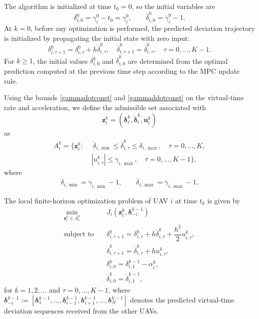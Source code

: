 \documentclass[letterpaper,journal]{IEEEtran}
\begin{document}
The algorithm is initialized at time \(t_0=0\), so the initial variables are
\[
\delta^0_{i,0}=\gamma_i^0-t_{0}=\gamma_i^0,
\qquad
\dot{\delta}^0_{i,0}=\dot{\gamma}_i^0-1.
\]
At $k=0$, before any optimization is performed, the predicted deviation trajectory is initialized by propagating the initial state with zero input:
\[
\delta^0_{i,\tau+1}=\delta^0_{i,\tau}+h\dot{\delta}^0_{i,\tau},
\quad
\dot{\delta}^0_{i,\tau+1}=\dot{\delta}^0_{i,\tau},\quad \tau=0,\dots,K-1.
\]
For \(k\ge 1\), the initial values \(\delta^k_{i,0}\) and \(\dot{\delta}^k_{i,0}\) are determined from the optimal prediction computed at the previous time step according to the MPC update rule.

Using the bounds \eqref{gammadotconst} and \eqref{gammaddotconst} on the virtual-time rate and acceleration, we define the admissible set associated with
\[
\mathbf{z}^{k}_{i} = (\bm{\delta}^{k}_{i}, \dot{\bm{\delta}}^{k}_{i}, \bm{u}^{k}_{i})
\]
as
\begin{equation}
\begin{split}
A_i^k = \Big\{ \mathbf{z}^k_i:\;
&\ \dot{\delta}_{i,\min}
\le
\dot{\delta}^k_{i,\tau}
\le
\dot{\delta}_{i,\max},
\quad \tau = 0,\dots,K,
\\
&
|u^k_{i,\tau}|
\le
\ddot{\gamma}_{i,\max},
\quad \tau = 0,\dots,K-1
\Big\},
\end{split}
\end{equation}
where 
\[
\dot{\delta}_{i,\min}=\dot{\gamma}_{i,\min} - 1,
\qquad
\dot{\delta}_{i,\max}=\dot{\gamma}_{i,\max} - 1.
\]

The local finite-horizon optimization problem of UAV $i$ at time $t_k$ is given by
\begin{equation}\label{ProblemK}
\begin{aligned}
\min_{\mathbf{z}^{k}_{i}\in A_{i}^k} \quad 
& J_i\!\left(\mathbf{z}^{k}_{i}, \bm{\delta}^{k-1}_{-i}\right)
\\
\text{subject to} \quad
& \delta_{i,\tau+1}^k
=
\delta_{i,\tau}^k
+
h\dot\delta_{i,\tau}^k
+
\dfrac{h^2}{2}u_{i,\tau}^k,
\\[3pt]
& \dot\delta_{i,\tau+1}^k
=
\dot\delta_{i,\tau}^k
+
hu_{i,\tau}^k,
\\[3pt]
& \delta^{k}_{i,0}
=
\delta^{k-1}_{i,1}
-
\alpha_{i}^{k},
\\[3pt]
& \dot{\delta}^{k}_{i,0}
=
\dot{\delta}^{k-1}_{i,1},
\end{aligned}
\end{equation}
for $k=1,2,\dots$ and $\tau = 0,\dots,K-1$, where $\bm{\delta}_{-i}^{k-1}:= \left[\bm{\delta}^{k-1}_{1},\dots,\bm{\delta}^{k-1}_{i-1},\bm{\delta}^{k-1}_{i+1},\dots,\bm{\delta}^{k-1}_{N}\right]$
denotes the predicted virtual-time deviation sequences received from the other UAVs.
\end{document}

